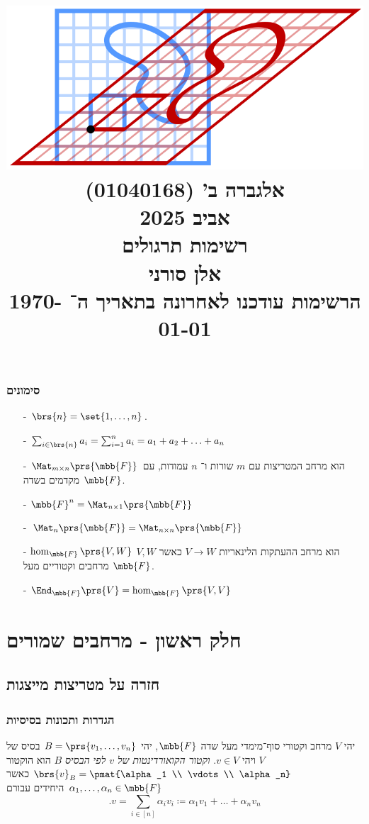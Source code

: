 \documentclass[a4paper,10pt,twoside,openany]{book}
\title{
\includegraphics[width=6in]{images/front.png}\\
\vspace{30pt}
\Huge
אלגברה ב' (01040168)
\\
אביב 2025
\\
רשימות תרגולים
\vspace{30pt}
\\
\huge
אלן סורני
\vspace{30pt}
\\
\Large
הרשימות עודכנו לאחרונה בתאריך ה־%
\today
}
\date{}
\begin{document}
\frontmatter
\maketitle
\tableofcontents

\mainmatter

\section*{סימונים}

\begin{itemize}
\item[-]
$\brs{n} = \set{1, \ldots, n}$.
\item[-]
$\sum_{i \in \brs{n}} a_i = \sum_{i=1}^n a_i = a_1 + a_2 + \ldots + a_n$
\item[-] $\Mat_{m \times n}\prs{\mbb{F}}$ הוא מרחב המטריצות עם
$m$
שורות ו־%
$n$
עמודות, עם מקדמים בשדה
$\mbb{F}$.
\item[-]
$\mbb{F}^n = \Mat_{n \times 1}\prs{\mbb{F}}$
\item[-]
$\Mat_{n}\prs{\mbb{F}} = \Mat_{n \times n}\prs{\mbb{F}}$
\item[-]
$\hom_{\mbb{F}}\prs{V,W}$
הוא מרחב ההעתקות הלינאריות
$V \to W$
כאשר
$V,W$
מרחבים וקטוריים מעל
$\mbb{F}$.
\item[-]
$\End_{\mbb{F}}\prs{V} = \hom_{\mbb{F}}\prs{V,V}$
\end{itemize}

\part{חלק ראשון - מרחבים שמורים}

\chapter{חזרה על מטריצות מייצגות}

\section{הגדרות ותכונות בסיסיות}

\begin{definition}
יהי
$V$
מרחב וקטורי סוף־מימדי מעל שדה
$\mbb{F}$,
יהי
$B = \prs{v_1, \ldots, v_n}$
בסיס של
$V$
ויהי
$v \in V$.
\emph{וקטור הקואורדינטות של
$v$
לפי הבסיס
$B$}
הוא הוקטור
$\brs{v}_B = \pmat{\alpha_1 \\ \vdots \\ \alpha_n}$
כאשר
$\alpha_1, \ldots, \alpha_n \in \mbb{F}$
היחידים עבורם
\[\text{.}v = \sum_{i \in [n]} \alpha_i v_i \coloneqq \alpha_1 v_1 + \ldots + \alpha_n v_n\]
\end{definition}
\end{document}
